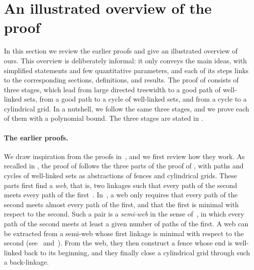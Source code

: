 \documentclass[fontsize=12pt,leading=14pt]{fullpaper}
\newcounter{step}
\begin{document}
%
\section{An illustrated overview of the proof}\label{sec:overview}
\raggedbottom

In this section we review the earlier proofs and give an illustrated overview of ours.
This overview is deliberately informal: it only conveys the main ideas, with simplified statements and few quantitative parameters, and each of its steps links to the corresponding sections, definitions, and results.
The proof of \textcite{HKMM24,HKMM26a,HKMM26b} consists of three stages, which lead from large directed treewidth to a good path of well-linked sets, from a good path to a cycle of well-linked sets, and from a cycle to a cylindrical grid.
In a nutshell, we follow the same three stages, and we prove each of them with a polynomial bound.
The three stages are stated in .

\paragraph{The earlier proofs.}
We draw inspiration from the proofs in~\cite{KawarabayashiK15,HKMM26a,HKMM26b}, and we first review how they work.
As recalled in , the proof of \textcite{HKMM26a,HKMM26b} follows the three parts of the proof of \textcite[sections~4--6]{KawarabayashiK15}, with paths and cycles of well-linked sets as abstractions of fences and cylindrical grids.
These parts first find a \emph{web}, that is, two linkages such that every path of the second meets every path of the first~\cite[Definition~3.8]{HKMM26a}.
In~\cite[Definition~4.1]{KawarabayashiK15}, a web only requires that every path of the second meets almost every path of the first, and that the first is minimal with respect to the second.
Such a pair is a \emph{semi-web} in the sense of~\cite[Definition~3.9]{HKMM26a}, in which every path of the second meets at least a given number of paths of the first.
A web can be extracted from a semi-web whose first linkage is minimal with respect to the second (see~\cite[Lemma~4.10]{KawarabayashiK15} and~\cite[Lemma~5.10]{HKMM26a}).
From the web, they then construct a fence whose end is well-linked back to its beginning, and they finally close a cylindrical grid through such a back-linkage.
\end{document}
